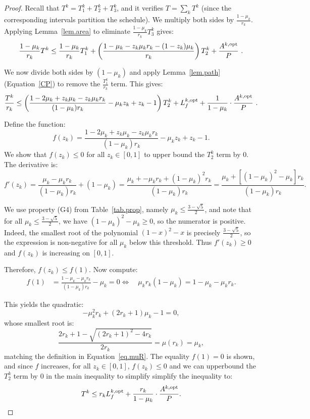 \documentclass{article}
\newcommand\rratio{r\xspace}
\newcommand\opt{\textnormal{opt}\xspace}
\begin{document}
\begin{proof}
Recall that $T^k = T_1^k + T_2^k + T_3^k$, and it verifies $T = \sum_k T^k$ (since the corresponding intervals partition the schedule). We multiply both sides by $\frac{1 - \mu_k}{\rratio_k}$. Applying Lemma~\ref{lem.area} to eliminate $\frac{1 - \mu_k}{\rratio_k} T_3^k$ gives:
\[
\frac{1 - \mu_k}{\rratio_k} T^k
\leq \frac{1 - \mu_k}{\rratio_k} T_1^k + 
\left( \frac{1 - \mu_k - z_k \mu_k \rratio_k - (1 - z_k)\mu_k }{\rratio_k} \right) T_2^k + \frac{A^{k,\opt}}{P} \ .
\]

We now divide both sides by $(1 - \mu_k)$ and apply Lemma~\ref{lem.path} (Equation~\eqref{CP}) to remove the $\frac{T_1^k}{\rratio_k}$ term. This gives:
\[
\frac{T^k}{\rratio_k}
\leq \left( \frac{1 - 2\mu_k + z_k \mu_k - z_k \mu_k \rratio_k }{(1 - \mu_k)\rratio_k}
- \mu_k z_k + z_k - 1 \right) T_2^k
+ L_f^{k,\opt} + \frac{1}{1 - \mu_k} \cdot \frac{A^{k,\opt}}{P} \ .
\]

Define the function:
\[
f(z_k) = \frac{1 - 2\mu_k + z_k \mu_k - z_k \mu_k \rratio_k}{(1 - \mu_k)\rratio_k} - \mu_k z_k + z_k - 1.
\]
We show that $f(z_k) \leq 0$ for all $z_k \in [0,1]$ to upper bound the $T_2^k$ term by $0$. The derivative is:
\[
f'(z_k) = \frac{\mu_k - \mu_k \rratio_k}{(1 - \mu_k)\rratio_k} + (1 - \mu_k)
= \frac{\mu_k + - \mu_k \rratio_k+(1 - \mu_k)^2 \rratio_k}{(1 - \mu_k)\rratio_k} = \frac{\mu_k + [(1 - \mu_k)^2 - \mu_k]\rratio_k }{(1 - \mu_k)\rratio_k}.
\]

We use property (G4) from Table~\ref{tab.prop}, namely $\mu_k \leq \frac{3 - \sqrt{5}}{2}$, and note that for all $\mu_k \leq \frac{3 - \sqrt{5}}{2}$, we have $(1 - \mu_k)^2 - \mu_k \geq 0$, so the numerator is positive. Indeed, the smallest root of the polynomial $(1 - x)^2 - x$ is precisely $\frac{3 - \sqrt{5}}{2}$, so the expression is non-negative for all $\mu_k$ below this threshold.
Thus $f'(z_k) \geq 0$ and $f(z_k)$ is increasing on $[0,1]$.

Therefore, $f(z_k) \leq f(1)$. Now compute:
\begin{align*}
f(1) &= \frac{1 - \mu_k - \mu_k \rratio_k}{(1 - \mu_k)\rratio_k} - \mu_k = 0  \Longleftrightarrow \quad \mu_k \rratio_k (1 - \mu_k) = 1 - \mu_k - \mu_k \rratio_k.
\end{align*}

This yields the quadratic:
\[
- \mu_k^2 \rratio_k + (2\rratio_k + 1)\mu_k - 1 = 0,
\]
whose smallest root is:
\[
 \frac{2\rratio_k + 1 - \sqrt{(2\rratio_k + 1)^2 - 4\rratio_k}}{2\rratio_k}= \mu(\rratio_k) =\mu_k ,
\]
matching the definition in Equation~\eqref{eq.muR}. The equality $f(1)=0$ is shown, and since $f$ increases, for all $z_k \in [0,1]$, $f(z_k) \leq 0$ and we can upperbound the $T_2^k$ term by $0$ in the main inequality to simplify simplify the inequality to:
\[
T^k \leq \rratio_k L_f^{k,\opt} + \frac{\rratio_k}{1 - \mu_k} \cdot \frac{A^{k,\opt}}{P}.
\]


\end{proof}
\end{document}
